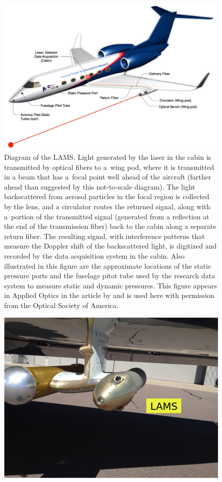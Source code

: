 \documentclass[12pt,twoside,english]{article}\usepackage[]{graphicx}\usepackage[]{color}
\begin{document}
{{\begin{figure}%
\noindent \begin{centering}%
\includegraphics[width=0.9\columnwidth]{SpecialGraphics/amt-2014-0031-f01.png}%
\caption[Diagram showing the LAMS as operated on the GV.]{Diagram of the LAMS. Light generated by the laser in the cabin is transmitted by optical fibers to a~wing pod, where it is transmitted in a beam that has a~focal point well ahead of the aircraft (farther ahead than suggested by this not-to-scale diagram). The light backscattered from aerosol particles in the focal region is collected by the lens, and a circulator routes the returned signal, along with a~portion of the transmitted signal (generated from a reflection at the end of the transmission fiber) back to the cabin along a separate return fiber. The resulting signal, with interference patterns that measure the Doppler shift of the backscattered light, is digitized and recorded by the data acquisition system in the cabin. Also illustrated in this figure are the approximate locations of the static pressure ports and the fuselage pitot tube used by the research data system to measure static and dynamic pressures. This figure appears in Applied Optics in the article by \citet{SpulerEtAl2011} and is used here with permission from the Optical Society of America.\label{fig:LAMSschematic}}%
\end{centering}%
\end{figure}%
\begin{figure}%
\noindent \begin{centering}%
\includegraphics[width=0.59\columnwidth]{SpecialGraphics/LAMS-1r}%

\end{centering}
\end{figure}}}
\end{document}

